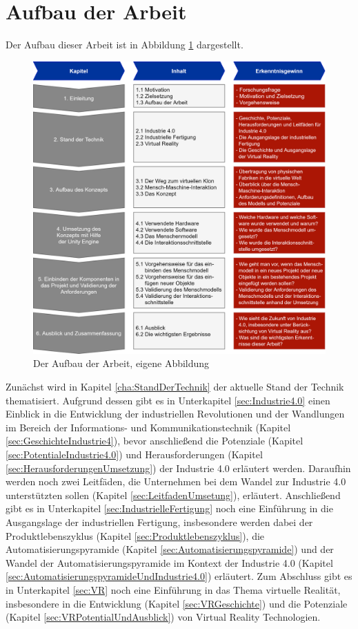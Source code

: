 \section{Aufbau der Arbeit}\label{sec:AufbauDerArbeit}
Der Aufbau dieser Arbeit ist in Abbildung \ref{fig:AufbauDerArbeit} dargestellt.
\begin{figure}[h]
	\centering
	\includegraphics[width=1\linewidth]{Bilder/A55_AufbauNeu2}
	\caption{Der Aufbau der Arbeit, eigene Abbildung}
	\label{fig:AufbauDerArbeit}
\end{figure}
\newline\newline
Zunächst wird in Kapitel \ref{cha:StandDerTechnik} der aktuelle Stand der Technik thematisiert. Aufgrund dessen gibt es in Unterkapitel \ref{sec:Industrie4.0} einen Einblick in die Entwicklung der industriellen Revolutionen und der Wandlungen im Bereich der Informations- und Kommunikationstechnik (Kapitel \ref{sec:GeschichteIndustrie4}), bevor anschließend die Potenziale (Kapitel \ref{sec:PotentialeIndustrie4.0}) und Herausforderungen (Kapitel \ref{sec:HerausforderungenUmsetzung}) der Industrie 4.0 erläutert werden. Daraufhin werden noch zwei Leitfäden, die Unternehmen bei dem Wandel zur Industrie 4.0 unterstützten sollen (Kapitel \ref{sec:LeitfadenUmsetung}), erläutert. Anschließend gibt es in Unterkapitel \ref{sec:IndustrielleFertigung} noch eine Einführung in die Ausgangslage der industriellen Fertigung, insbesondere werden dabei der Produktlebenszyklus (Kapitel \ref{sec:Produktlebenszyklus}), die Automatisierungspyramide (Kapitel \ref{sec:Automatisierungspyramide}) und der Wandel der Automatisierungspyramide im Kontext der Industrie 4.0 (Kapitel \ref{sec:AutomatisierungspyramideUndIndustrie4.0}) erläutert. Zum Abschluss gibt es in Unterkapitel \ref{sec:VR} noch eine Einführung in das Thema virtuelle Realität, insbesondere in die Entwicklung (Kapitel \ref{sec:VRGeschichte}) und die Potenziale (Kapitel \ref{sec:VRPotentialUndAusblick}) von Virtual Reality Technologien.
